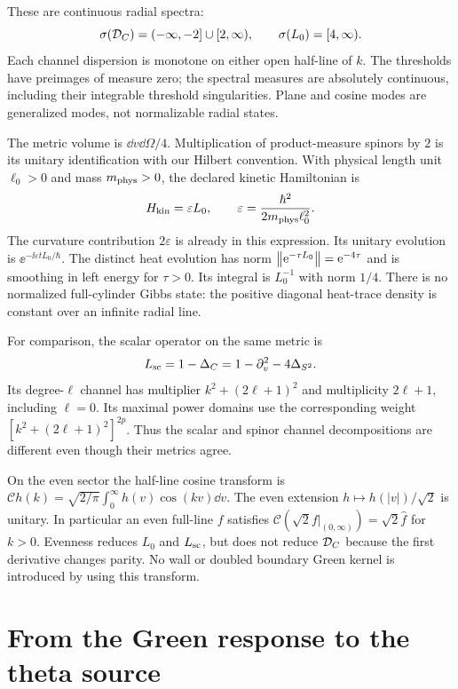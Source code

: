 These are continuous radial spectra:
\[
 \sigma(\mathcal D_C)=(-\infty,-2]\cup[2,\infty),\qquad
 \sigma(L_0)=[4,\infty).
\]
Each channel dispersion is monotone on either open half-line of $k$.
The thresholds have preimages of measure zero; the spectral measures
are absolutely continuous, including their integrable threshold
singularities. Plane and cosine modes are generalized modes, not
normalizable radial states.

The metric volume is $\dd v\dd\Omega/4$. Multiplication of product-measure
spinors by $2$ is its unitary identification with our Hilbert convention.
With physical length unit $\ell_0>0$ and mass $m_{\rm phys}>0$, the
declared kinetic Hamiltonian is
\[
 H_{\rm kin}=\varepsilon L_0,\qquad
 \varepsilon=\frac{\hbar^2}{2m_{\rm phys}\ell_0^2}.
\]
The curvature contribution $2\varepsilon$ is already in this expression.
Its unitary evolution is $\ee^{-\ii\varepsilon tL_0/\hbar}$.
The distinct heat evolution has norm
$\left\lVert\mathrm e^{-\tau L_0}\right\rVert=\mathrm e^{-4\tau}$ and is smoothing in left energy
for $\tau>0$. Its integral is $L_0^{-1}$ with norm $1/4$.
There is no normalized full-cylinder Gibbs state: the positive diagonal
heat-trace density is constant over an infinite radial line.

For comparison, the scalar operator on the same metric is
\begin{equation}\label{eq:scalaroperator}
 L_{\mathrm{sc}}=1-\Delta_C=1-\partial_v^2-4\Delta_{S^2}.
\end{equation}
Its degree-$\ell$ channel has multiplier $k^2+(2\ell+1)^2$ and
multiplicity $2\ell+1$, including $\ell=0$. Its maximal power domains
use the corresponding weight $[k^2+(2\ell+1)^2]^{2p}$.
Thus the scalar and spinor channel decompositions are different even
though their metrics agree.

On the even sector the half-line cosine transform is
$\mathcal C h(k)=\sqrt{2/\pi}\int_0^\infty h(v)\cos(kv)\dd v$.
The even extension $h\mapsto h(|v|)/\sqrt2$ is unitary. In particular
an even full-line $f$ satisfies
$\mathcal C(\sqrt2 f|_{(0,\infty)})=\sqrt2\widehat f$ for $k>0$.
Evenness reduces $L_0$ and $L_{\mathrm{sc}}$, but does not reduce $\mathcal D_C$ because
the first derivative changes parity. No wall or doubled boundary Green
kernel is introduced by using this transform.

\section{From the Green response to the theta source}\label{sec:theta}

